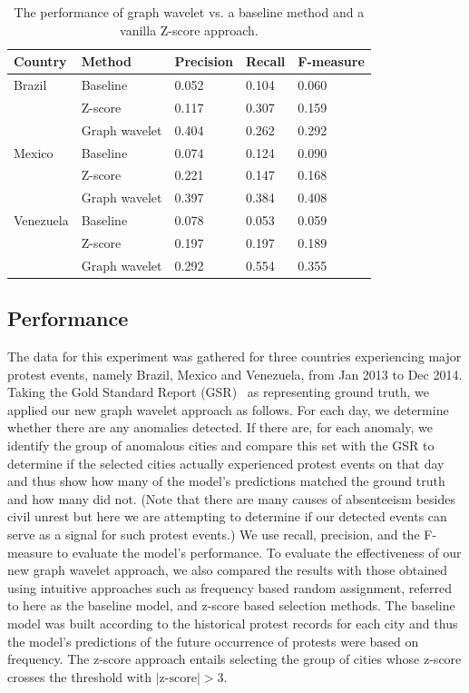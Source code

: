 \begin{table}[bt] %
\renewcommand{\arraystretch}{1.1}
\caption{\label{table:models_compare} The performance of graph wavelet vs. a baseline method and a vanilla Z-score approach.}
\scriptsize
\centering
\begin{tabular}{ l | l |l | l | l}
\hline
\textbf{Country} & \textbf{Method}& \textbf{Precision}  & \textbf{Recall}  & \textbf{F-measure} \\
\hline
Brazil & Baseline & 0.052 &0.104 & 0.060\\
       & Z-score & 0.117&0.307 & 0.159 \\
 & Graph wavelet& 0.404 &0.262 & 0.292 \\
\hline
Mexico & Baseline & 0.074 &0.124 & 0.090 \\
       & Z-score & 0.221 &0.147 & 0.168 \\
 & Graph wavelet& 0.397 &0.384 & 0.408 \\
\hline
Venezuela & Baseline & 0.078 &0.053 & 0.059 \\
       & Z-score & 0.197 &0.197 & 0.189 \\
 & Graph wavelet& 0.292 &0.554 & 0.355 \\
\hline
\end{tabular}
\end{table}



\subsection{Performance}
The data for this experiment was gathered for three countries experiencing major protest events, namely Brazil, Mexico and Venezuela, from Jan 2013 to Dec 2014. Taking the Gold Standard Report (GSR)~\cite{ramakrishnan2014beating} as representing ground truth, we applied our new graph wavelet approach as follows. For each day, we determine whether there are any anomalies detected. If there are,
for each anomaly, we
identify the group of anomalous cities and compare this set
with the GSR to determine if the selected cities actually experienced protest events on that day and thus show how many of the model's predictions matched the ground truth and how many did not. (Note that there are many causes of absenteeism besides civil unrest but here we are attempting to determine if our
detected events can serve as a signal for such protest events.)
We use recall, precision, and the F-measure to evaluate the model's performance. To evaluate the effectiveness of our new graph wavelet approach, we also compared the results with those obtained using intuitive approaches such as frequency based random assignment, referred to here as the baseline model, and z-score based selection methods. The baseline model was built according to the historical protest records for each city and thus the model's predictions of the future occurrence of protests were based on frequency. The z-score approach entails
selecting the group of cities whose z-score crosses the threshold with $|\text{z-score}|>3$.


